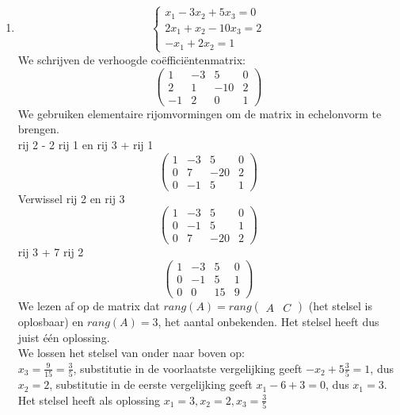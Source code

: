 \begin{enumerate} 
	\item \[ \left\{ 
	\begin{array}{l}
		x_1 -3x_2 +5x_3  = 0 \\
		2x_1 + x_2 -10x_3 = 2 \\
		-x_1 + 2x_2 = 1 \end{array} 
	\right. \]
	We schrijven de verhoogde co\"{e}ffici\"{e}ntenmatrix:
	\[ \left(
	\begin{array}{ccc|c}
	1 & -3 & 5 & 0 \\
	2 & 1 & -10 & 2 \\
	-1 & 2 & 0 & 1 \end{array} \right) 
	\]
	We gebruiken elementaire rijomvormingen om de matrix in echelonvorm te brengen. \\
	
	rij 2 - 2 rij 1 en rij 3 + rij 1 
	\[ \left(
	\begin{array}{ccc|c}
	1 & -3 & 5 & 0 \\
	0 & 7 & -20 & 2 \\
	0 & -1 & 5 & 1 \end{array} \right) 
	\]
	Verwissel rij 2 en rij 3
	\[ \left(
	\begin{array}{ccc|c}
	1 & -3 & 5 & 0 \\
	0 & -1 & 5 & 1 \\
	0 & 7 & -20 & 2  \end{array} \right) 
	\]
	rij 3 + 7 rij 2
	\[ \left(
	\begin{array}{ccc|c}
	1 & -3 & 5 & 0 \\
	0 & -1 & 5 & 1 \\
	0 & 0 & 15 & 9  \end{array} \right) 
	\]
	We lezen af op de matrix dat $rang(A)=rang \left( \begin{array}{c|c} A & C \end{array} \right)$ (het stelsel is oplosbaar) en $rang(A)=3$, het aantal onbekenden. Het stelsel heeft dus juist \'{e}\'{e}n oplossing.\\
	We lossen het stelsel van onder naar boven op: \\
	$x_3 =\frac{9}{15}=\frac{3}{5}$, substitutie in de voorlaatste vergelijking geeft $-x_2 + 5\frac{3}{5} = 1$, dus $x_2 =2$, substitutie in de eerste vergelijking geeft $x_1 -6+3=0$, dus $x_1 =3$.\\
	Het stelsel heeft als oplossing $x_1 =3, x_2 =2, x_3= \frac{3}{5}$\\ 
	

\end{enumerate}
